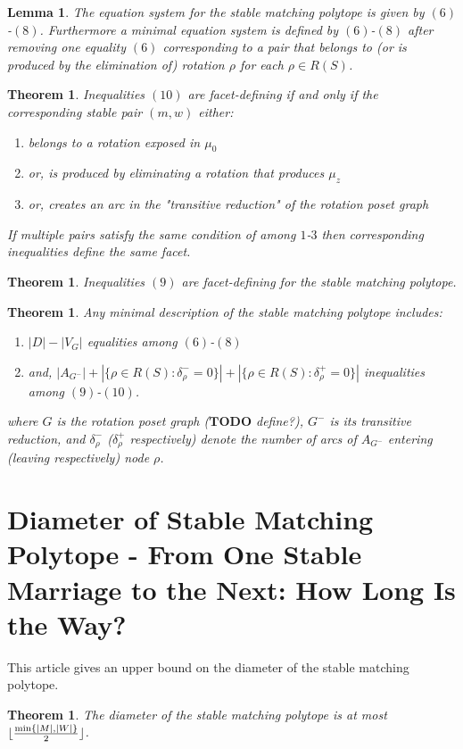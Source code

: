 \documentclass{article}
\DeclarePairedDelimiter\floor{\lfloor}{\rfloor}
\newtheorem{lemma}[fact]{Lemma}
\newtheorem{theorem}[fact]{Theorem}
\begin{document}
\begin{lemma}
The equation system for the stable matching polytope is given by $(6)$-$(8)$. Furthermore a minimal equation system is defined by $(6)$-$(8)$ after removing one equality $(6)$ corresponding to a pair that belongs to (or is produced by the elimination of) rotation $\rho$ for each $\rho \in R(S)$.
\end{lemma}
\begin{theorem}
Inequalities $(10)$ are facet-defining if and only if the corresponding stable pair $(m,w)$ either:
\begin{enumerate}
\item belongs to a rotation exposed in $\mu_0$
\item or, is produced by eliminating a rotation that produces $\mu_z$
\item or, creates an arc in the "transitive reduction" of the rotation poset graph
\end{enumerate}
If multiple pairs satisfy the same condition of among $1$-$3$ then corresponding inequalities define the same facet.
\end{theorem}
\begin{theorem}
Inequalities $(9)$ are facet-defining for the stable matching polytope.
\end{theorem}

\begin{theorem}
Any minimal description of the stable matching polytope includes:
\begin{enumerate}
\item $|D| - |V_G|$ equalities among $(6)$-$(8)$
\item and, $|A_{G^-}| + |\{\rho \in R(S) : \delta^-_\rho = 0\}| + | \{ \rho \in R(S) : \delta^+_\rho = 0\}|$ inequalities among $(9)$-$(10)$.
\end{enumerate}
where $G$ is the rotation poset graph ($\textbf{TODO}$ define?), $G^-$ is its transitive reduction, and $\delta^-_\rho$ ($\delta^+_\rho$ respectively) denote the number of arcs of $A_{G^-}$ entering (leaving respectively) node $\rho$.
\end{theorem}

\section{Diameter of Stable Matching Polytope - From One Stable Marriage to the Next: How Long Is the Way?}
This article \cite{eirinakis2014one} gives an upper bound on the diameter of the stable matching polytope.
\begin{theorem}
The diameter of the stable matching polytope is at most $\floor{\frac{\min\{|M|,|W|\}}{2}}$.
\end{theorem}


\end{document}
